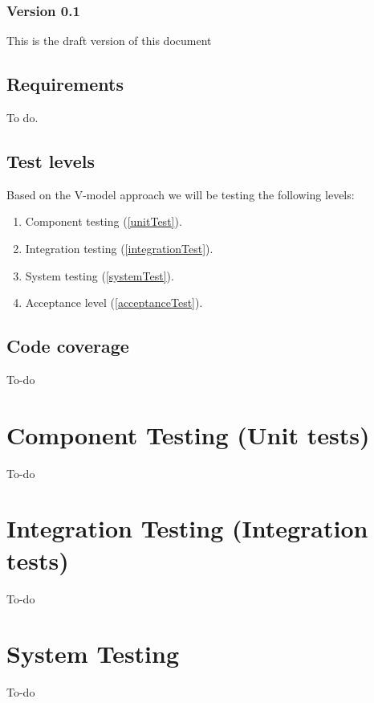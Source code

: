 \documentclass[signature]{deltares_report}
\begin{document}
\subsection{Version 0.1}
\label{sec:Version}
This is the draft version of this document

\section{Requirements}
\label{sec:requirements}
To do.


\section{Test levels}
\label{sec:testLevels}
Based on the V-model approach we will be testing the following levels:
\begin{enumerate}
\item Component testing (\autoref{unitTest}).
\item Integration testing (\autoref{integrationTest}).
\item System testing (\autoref{systemTest}).
\item Acceptance level (\autoref{acceptanceTest}).
\end{enumerate}

\section{Code coverage}
\label{sec:codeCoverage}
To-do
\chapter{Component Testing (Unit tests)}
\label{unitTest}
To-do

\chapter{Integration Testing (Integration tests)}
\label{integrationTest}
To-do

\chapter{System Testing}
\label{systemTest}
To-do

\end{document}
